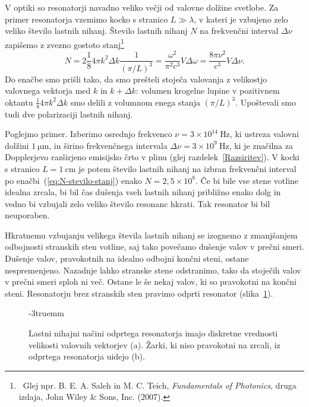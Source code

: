 V optiki so resonatorji navadno veliko večji
od valovne dolžine svetlobe. Za primer resonatorja vzemimo kocko s stranico $L\gg \lambda$, 
v kateri je vzbujeno zelo veliko število lastnih nihanj. Število lastnih nihanj $N$ 
na frekvenčni interval $\Delta \nu$ zapišemo z zvezno gostoto 
stanj\footnote{~Glej npr. B. E. A. Saleh in M. C. Teich, 
{\it Fundamentals of Photonics}, druga izdaja, John Wiley \& Sons, Inc. (2007).}
\begin{equation}
N=2 \frac{1}{8} 4\pi k^{2}\Delta k \frac{1}{(\pi/L)^3}=\frac{\omega^{2}}{\pi^{2}c^{3}}V\Delta\omega=
\frac{8\pi \nu^{2}}{c^{3}}V\Delta\nu.
\label{eq:N-stevilo-stanj}
\end{equation}
Do enačbe smo prišli tako, da smo prešteli stoječa valovanja z velikostjo
valovnega vektorja med $k$ in $k+\Delta k$: volumen krogelne lupine v pozitivnem oktantu
$\frac{1}{8} 4\pi k^{2}\Delta k$ smo delili z volumnom enega stanja $(\pi/L)^3$. 
Upoštevali smo tudi dve polarizaciji lastnih nihanj.

Poglejmo primer. Izberimo osrednjo frekvenco $\nu=3\times 10^{14}~\si{\hertz}$, ki
ustreza valovni dolžini $1~\si{\micro\metre}$, in širino frekvenčnega
intervala $\Delta\nu=3\times 10^{9}~\si{\hertz}$, ki je značilna za Dopplerjevo
razširjeno emisijsko črto v plinu (glej razdelek~\ref{Razsiritev}). 
V kocki s stranico $L=1~\si{\centi\metre}$ 
je potem število lastnih nihanj na izbran frekvenčni interval 
po enačbi~(\ref{eq:N-stevilo-stanj}) enako
$N=2,5\times 10^{8}$. Če bi bile vse stene votline idealna zrcala,
bi bil čas dušenja vseh lastnih nihanj približno enako dolg in vedno bi vzbujali
zelo veliko število resonanc hkrati. Tak resonator bi bil neuporaben.

Hkratnemu vzbujanju velikega števila lastnih nihanj se izognemo z zmanjšanjem odbojnosti
stranskih sten votline, saj tako povečamo dušenje valov v prečni smeri.
Dušenje valov, pravokotnih na idealno odbojni končni steni, ostane nespremenjeno.
Nazadnje lahko stranske stene odstranimo, tako da stoječih valov v prečni smeri
sploh ni več. Ostane le še nekaj valov, ki so pravokotni na končni
steni. Resonatorju brez stranskih sten  pravimo odprti resonator 
(slika~\ref{fig:Odprt_resonator}).
\begin{figure}[h]
\centering
\def\svgwidth{110truemm} 

\caption{Lastni nihajni načini odprtega resonatorja imajo diskretne vrednosti
velikosti valovnih vektorjev (a). Žarki, ki niso pravokotni na zrcali, 
iz odprtega resonatorja uidejo (b).}
\label{fig:Odprt_resonator}
\vglue-3truemm
\end{figure}


